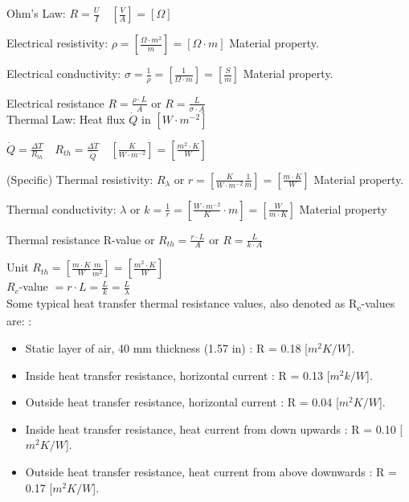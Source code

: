 Ohm's Law: $ R = \frac{U}{I} \quad [\frac{V}{A}] = [\Omega] $

Electrical resistivity: $ \rho = [\frac{\Omega \cdot m^2}{m} ] = [\Omega \cdot m] $ Material property.

Electrical conductivity: $ \sigma = \frac{1}{\rho} =[\frac{1}{\Omega \cdot m}] = [\frac{S}{m}] $ Material property.

Electrical resistance $ R = \frac{\rho \cdot L}{A} $ or $ R = \frac{L}{\sigma \cdot A} $
\\

Thermal Law: 
Heat flux $ \dot Q $ in $ [W \cdot m^{-2}] $

$ \dot Q = \frac{\Delta T}{R_{th}} \quad R_{th} = \frac{\Delta T}{\dot  Q} 
\quad [\frac{K}{W \cdot m^{-2}}] = [\frac{m^2 \cdot K}{W}]$

(Specific) Thermal resistivity: $ R_\lambda $ or $ r = [\frac{K}{W \cdot m^{-2}} \frac{1}{m} ] = [\frac{m \cdot K}{W}] $ Material property.

Thermal conductivity: $ \lambda $ or $ k  = \frac{1}{r} = [\frac{ W \cdot m^{-2} }{K} \cdot m] 
= [\frac{W}{m \cdot K}] $ Material property

Thermal resistance R-value or $ R_{th} = \frac{r \cdot L}{A} $ or $ R = \frac{L}{k \cdot A} $

Unit $ R_{th} = [\frac{m \cdot K}{W} \frac{m}{m^2}] = [\frac{m^2 \cdot K}{W}] $
\\

$R_c$-value $ = r \cdot L = \frac{L}{k} = \frac{L}{\lambda} $
\\

Some typical heat transfer thermal resistance values, also denoted as R\textsubscript{c}-values are: \cite{OVERALL}: 

\begin{itemize}
	\item Static layer of air, 40 mm thickness (1.57 in)  : R = 0.18 [$m^2K/W$].
	\item Inside heat transfer resistance, horizontal current : R = 0.13 [$m^2k/W$]. 
	\item Outside heat transfer resistance, horizontal current : R = 0.04 [$m^2K/W$].
	\item Inside heat transfer resistance, heat current from down upwards : R = 0.10 [$m^2K/W$].
	\item Outside heat transfer resistance, heat current from above downwards : R = 0.17 [$m^2K/W$].
	
\end{itemize}

